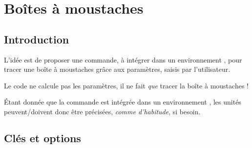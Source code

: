 \documentclass{article}
\begin{document}
\begin{codesortie}
\def\LLX{1994,1995,1996,1997,1998,1999,2000,2001,2002,2004,2005,2006,2007,2008,2009,2010}
\def\LLY{1718,1710,1708,1700,1698,1697,1691,1688,1683,1679,1671,1670,1663,1661,1656,1649}

\end{codesortie}

\newpage

\section{Boîtes à moustaches}\label{boiteamoustaches}

\subsection{Introduction}

\begin{codeidee}
L'idée est de proposer une commande, à intégrer dans un environnement \TikZ, pour tracer une boîte à moustaches grâce aux paramètres, saisis par l'utilisateur.

\smallskip

Le code ne calcule pas les paramètres, il ne fait \textit{que} tracer la boîte à moustaches !
\end{codeidee}

\begin{codetex}[]
\begin{tikzpicture}
	\PLboitemoust[parametres={10/15/17/19/20}]
\end{tikzpicture}
\end{codetex}

\begin{codeinfo}
Étant donnée que la commande est intégrée dans un environnement \TikZ, les unités peuvent/doivent donc être précisées, \textit{comme d'habitude}, si besoin.
\end{codeinfo}

\subsection{Clés et options}
\end{document}
